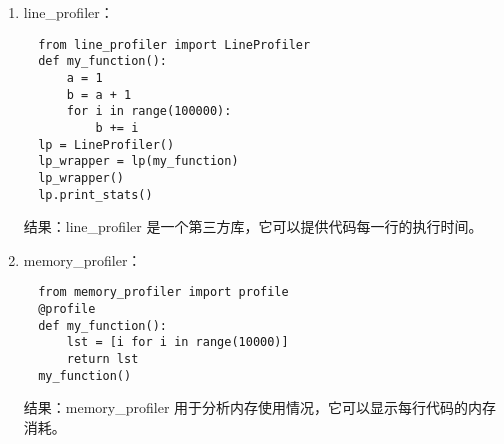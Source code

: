 \documentclass[UTF8]{ctexart}
\begin{document}
\begin{enumerate}
  \item line\_profiler：
  \begin{verbatim}
  from line_profiler import LineProfiler
  def my_function():
      a = 1
      b = a + 1
      for i in range(100000):
          b += i
  lp = LineProfiler()
  lp_wrapper = lp(my_function)
  lp_wrapper()
  lp.print_stats()
  \end{verbatim}
  结果：line\_profiler 是一个第三方库，它可以提供代码每一行的执行时间。
  
  \item memory\_profiler：
  \begin{verbatim}
  from memory_profiler import profile
  @profile
  def my_function():
      lst = [i for i in range(10000)]
      return lst
  my_function()
  \end{verbatim}
  结果：memory\_profiler 用于分析内存使用情况，它可以显示每行代码的内存消耗。
\end{enumerate}
\end{document}

